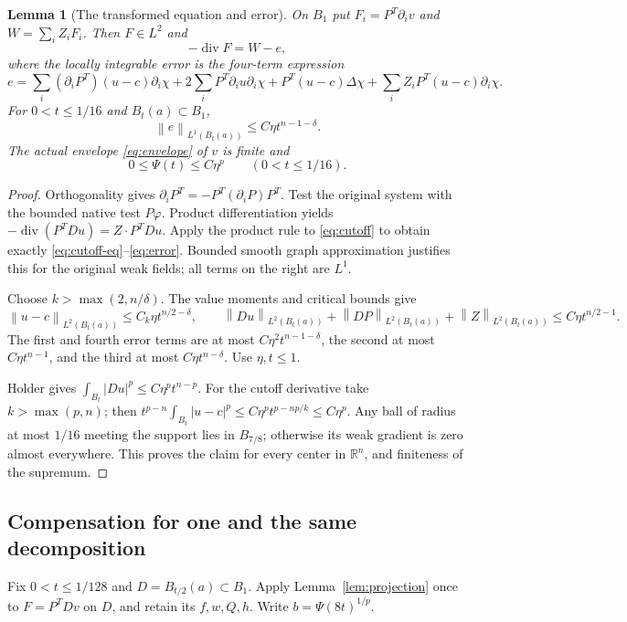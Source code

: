 \documentclass[reqno,11pt]{amsart}
\numberwithin{equation}{section}
\newtheorem{lemma}[theorem]{Lemma}
\theoremstyle{definition}
\theoremstyle{remark}
\newcommand{\R}{\mathbb R}
\newcommand{\diver}{\operatorname{div}}
\newcommand{\norm}[1]{\left\lVert#1\right\rVert}
\begin{document}
\begin{lemma}[The transformed equation and error]\label{lem:cutoff}
On $B_1$ put $F_i=P^T\partial_i v$ and $W=\sum_iZ_iF_i$.
Then $F\in L^2$ and
\begin{equation}\label{eq:cutoff-eq}
 -\diver F=W-e,
\end{equation}
where the locally integrable error is the four-term expression
\begin{equation}\label{eq:error}
 e=\sum_i(\partial_iP^T)(u-c)\partial_i\chi
   +2\sum_iP^T\partial_i u\partial_i\chi
   +P^T(u-c)\Delta\chi
   +\sum_i Z_iP^T(u-c)\partial_i\chi.
\end{equation}
For $0<t\leq1/16$ and $B_t(a)\subset B_1$,
\begin{equation}\label{eq:error-L1}
 \norm e_{L^1(B_t(a))}\leq C\eta t^{n-1-\delta}.
\end{equation}
The actual envelope \eqref{eq:envelope} of $v$ is finite and
\begin{equation}\label{eq:initial-envelope}
 0\leq\Psi(t)\leq C\eta^p\qquad(0<t\leq1/16).
\end{equation}
\end{lemma}
\begin{proof}
Orthogonality gives $\partial_iP^T=-P^T(\partial_iP)P^T$. Test the
original system with the bounded native test $P\varphi$. Product
differentiation yields $-\diver(P^TDu)=Z\cdot P^TDu$. Apply the
product rule to \eqref{eq:cutoff} to obtain exactly
\eqref{eq:cutoff-eq}--\eqref{eq:error}. Bounded smooth graph
approximation justifies this for the original weak fields; all terms
on the right are $L^1$.

Choose $k>\max(2,n/\delta)$. The value moments and critical bounds give
\[
 \norm{u-c}_{L^2(B_t(a))}\leq C_k\eta t^{n/2-\delta},\qquad
 \norm{Du}_{L^2(B_t(a))}+\norm{DP}_{L^2(B_t(a))}
 +\norm Z_{L^2(B_t(a))}\leq C\eta t^{n/2-1}.
\]
The first and fourth error terms are at most
$C\eta^2t^{n-1-\delta}$, the second at most $C\eta t^{n-1}$, and
the third at most $C\eta t^{n-\delta}$. Use $\eta,t\leq1$.

Holder gives $\int_{B_t}|Du|^p\leq C\eta^pt^{n-p}$. For the
cutoff derivative take $k>\max(p,n)$; then
$t^{p-n}\int_{B_t}|u-c|^p\leq C\eta^pt^{p-np/k}\leq C\eta^p$.
Any ball of radius at most $1/16$ meeting the support lies in $B_{7/8}$;
otherwise its weak gradient is zero almost everywhere. This proves the
claim for every center in $\R^n$, and finiteness of the supremum.
\end{proof}

\subsection{Compensation for one and the same decomposition}\label{sec:same-fields}
Fix $0<t\leq1/128$ and $D=B_{t/2}(a)\subset B_1$. Apply
Lemma~\ref{lem:projection} once to $F=P^TDv$ on $D$, and retain its
$f,w,Q,h$. Write $b=\Psi(8t)^{1/p}$.
\end{document}

